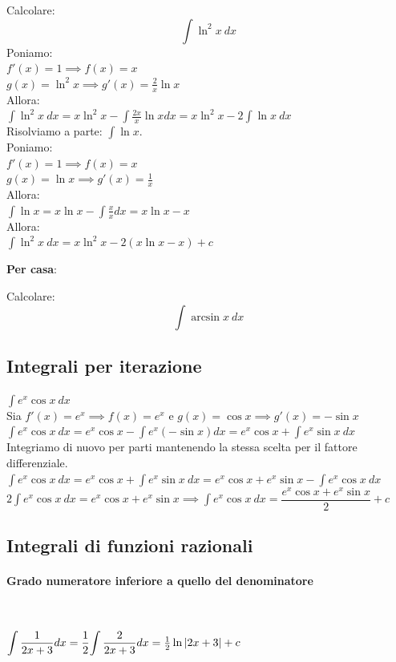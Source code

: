 \documentclass[12pt]{report}
\begin{document}
		\begin{example}{}{}
			Calcolare:
			\[
			\int \ln^2x\ dx
			\]
			Poniamo: \\
			$f'(x) = 1 \implies f(x) = x$ \\
			$g(x) = \ln^2 x \implies g'(x) = \frac{2}{x}\ln x$ \\
			Allora: \\
			$\int \ln^2x\ dx = x\ln^2x - \int \frac{2x}{x}\ln xdx = x\ln^2x - 2\int\ln x\ dx$ \\
			Risolviamo a parte: $\int \ln x$. \\
			Poniamo: \\
			$f'(x) = 1 \implies f(x) = x$ \\
			$g(x) = \ln x \implies g'(x) = \frac{1}{x}$ \\
			Allora:
			\\
			$\int \ln x = x\ln x - \int \frac{x}{x}dx= x\ln x - x$ \\
			Allora: \\
			$\int \ln^2x\ dx = x\ln^2x - 2(x\ln x - x) + c$
		\end{example}
		\textbf{Per casa}:\begin{assignment}{}{}
			Calcolare:
			\[
			\int \arcsin x\ dx
			\]
		\end{assignment}
		\subsection{Integrali per iterazione}
		$\int e^x\cos x\ dx$ \\
		Sia $f'(x) = e^x \implies f(x) = e^x$ e $g(x) = \cos x \implies g'(x) = -\sin x$\\
		$\int e^x\cos x\ dx = e^x\cos x - \int e^x(-\sin x)dx = e^x\cos x + \int e^x\sin x\ dx$ \\
		Integriamo di nuovo per parti mantenendo la stessa scelta per il fattore differenziale. \\
		$\int e^x\cos x\ dx = e^x\cos x + \int e^x\sin x\ dx = e^x\cos x + e^x\sin x - \int e^x\cos x\ dx$ \\
		$2\int e^x\cos x\ dx = e^x\cos x + e^x\sin x \implies \int e^x\cos x\ dx = \dfrac{e^x\cos x+ e^x\sin x}{2} + c$
		\subsection{Integrali di funzioni razionali}
		\paragraph{Grado numeratore inferiore a quello del denominatore} \quad \\
		\begin{example}{}{}
			$\mathlarger{\int \frac{1}{2x + 3}dx} = \dfrac{1}{2}\mathlarger{\int \frac{2}{2x+3}dx} = \frac{1}{2}\ln |2x + 3| + c$
		\end{example}
\end{document}
